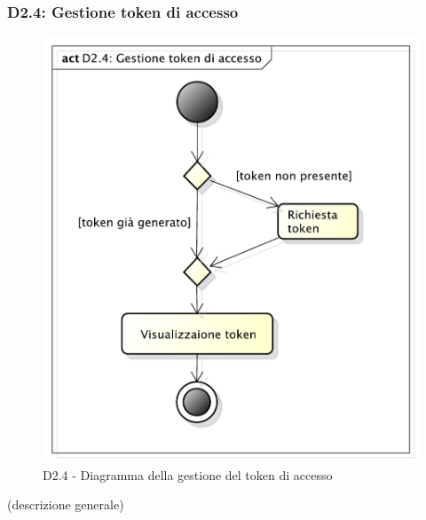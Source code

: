 		\subsubsection{D2.4: Gestione token di accesso} %
		\label{ssub:gestione_token_di_accesso}
		\begin{figure}[!htbp]
			\centering
			\centerline{\includegraphics[scale=0.45]{./images/D2_4.pdf}}
			\caption{D2.4 - Diagramma della gestione del token di accesso}
		\end{figure}
		\noindent
		[TO DO] (descrizione generale)


